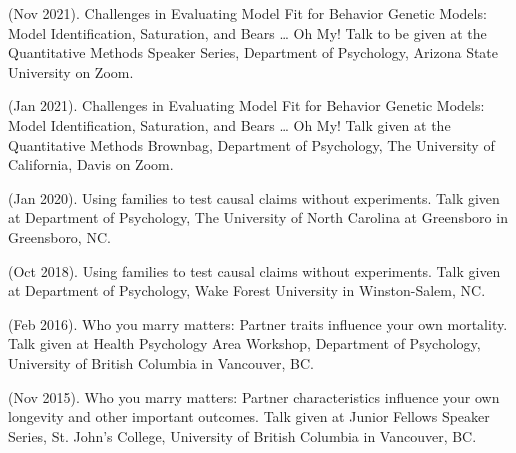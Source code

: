 %
\item\meb (Nov 2021). Challenges in Evaluating Model Fit for Behavior Genetic Models: Model Identification, Saturation, and Bears … Oh My! Talk to be given at the Quantitative Methods Speaker Series, Department of Psychology, Arizona State University on Zoom.
%
\item\meb (Jan 2021). Challenges in Evaluating Model Fit for Behavior Genetic Models: Model Identification, Saturation, and Bears … Oh My! Talk given at the Quantitative Methods Brownbag, Department of Psychology, The University of California, Davis on Zoom.
%
\item\meb (Jan 2020). Using families to test causal claims without experiments. Talk given at Department of Psychology, The University of North Carolina at Greensboro in Greensboro, NC.
%
%
%
\item\meb (Oct 2018). Using families to test causal claims without experiments. Talk given at Department of Psychology, Wake Forest University in Winston-Salem, NC.
%
\item \meb (Feb 2016). Who you marry matters: Partner traits influence your own mortality. Talk given at Health Psychology Area Workshop, Department of Psychology, University of British Columbia in Vancouver, BC. 
%
\item \meb (Nov 2015). Who you marry matters: Partner characteristics influence your own longevity and other important outcomes. Talk given at Junior Fellows Speaker Series, St. John's College, University of British Columbia in Vancouver, BC. \smallskip


